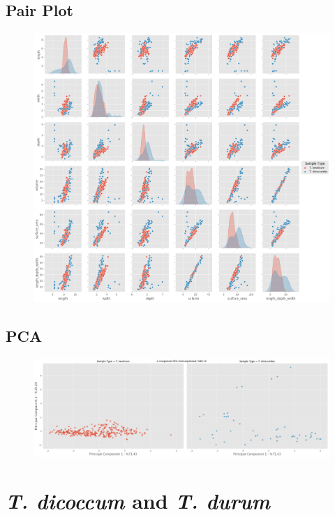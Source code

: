 \documentclass[11pt]{report}
\begin{document}
\subsection{Pair Plot}
\label{sec:orga1a94e6}

\begin{figure}[htbp]
\centering
\includegraphics[width=18cm]{./images/results/group4/pairplot.png}
\label{fig:orgf0126a9}
\end{figure}

\clearpage
\subsection{PCA}
\label{sec:org4302026}
\begin{figure}[htbp]
\centering
\includegraphics[width=18cm]{./images/results/group4/pca.png}
\label{fig:org4109452}
\end{figure}


\clearpage
\section{\emph{T. dicoccum} and \emph{T. durum}}
\label{sec:orgbea187c}
\end{document}
